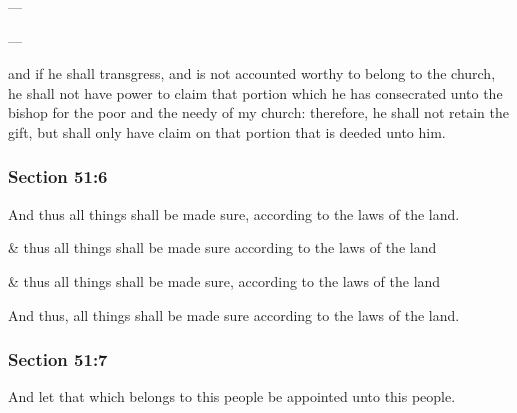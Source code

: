 		\begin{framed}
		\scriptsize
			\begin{compactdesc}
				\item[JSP] ---
				\item[Gilbert] ---
				\item[DC 1835] and if he shall transgress, and is not accounted worthy to belong to the church, he shall not have power to claim that portion which he has consecrated unto the bishop for the poor and the needy of my church: therefore, he shall not retain the gift, but shall only have claim on that portion that is deeded unto him.
			\end{compactdesc}
		\end{framed}

	\subsubsection{Section 51:6} %
		\label{DC51-6}

		And thus all things shall be made sure, according to the laws of the land.

		\begin{framed}
		\scriptsize
			\begin{compactdesc}
				\item[JSP] \& thus all things shall be made sure according to the laws of the land
				\item[Gilbert] \& thus all things shall be made sure, according to the laws of the land
				\item[DC 1835] And thus, all things shall be made sure according to the laws of the land.
			\end{compactdesc}
		\end{framed}

	\subsubsection{Section 51:7} %
		\label{DC51-7}

		And let that which belongs to this people be appointed unto this people.


